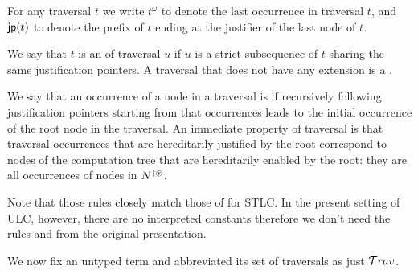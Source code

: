 \documentclass{article}
\theoremstyle{definition}
\newcommand\Nodes{N}%
\newcommand{\NodeHjByRoot}{\Nodes^{\filter\theroot}}
\begin{document}
For any traversal $t$ we write $t^\omega$ to denote the last occurrence in traversal $t$, and ${\sf jp}(t)$ to denote the prefix of $t$ ending at the justifier of the last node of $t$.

We say that $t$ is an  of traversal $u$ if $u$ is a strict subsequence of $t$ sharing the same justification pointers.
A traversal that does not have any extension is a .

We say that an occurrence of a node in a traversal is  if recursively following justification pointers starting from that occurrences leads to the initial occurrence of the root node in the traversal. An immediate property of traversal is that traversal occurrences that are hereditarily justified by the root correspond to nodes of the computation tree that are hereditarily enabled by the root: \ie they are all occurrences of nodes in $\NodeHjByRoot$.

Note that those rules closely match those of \cite{BlumPhd} for STLC. In the present setting of ULC, however, there are no interpreted constants therefore we don't need the rules  and  from the original presentation.

We now fix an untyped term and abbreviated its set of traversals as just $\mathcal{T}rav$.
\end{document}
